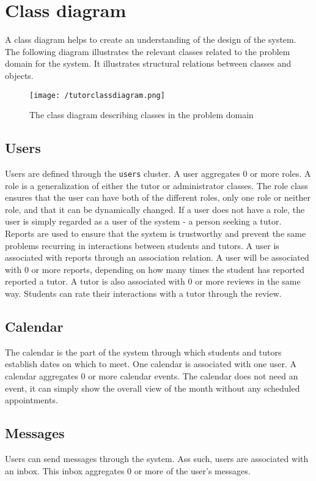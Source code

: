 \section{Class diagram}
A class diagram helps to create an understanding of the design of the system.
The following diagram illustrates the relevant classes related to the problem domain for the system.
It illustrates structural relations between classes and objects\cite{OOAD}.

\begin{figure}[H]
    \texttt{[image: /tutorclassdiagram.png]}
     \caption{The class diagram describing classes in the problem domain}
     \label{fig:class-diagram}
 \end{figure}

\subsection{Users}
Users are defined through the \texttt{users} cluster.
A user aggregates 0 or more roles. 
A role is a generalization of either the tutor or administrator classes. 
The role class ensures that the user can have both of the different roles, only one role or neither role, and that it can be dynamically changed.
If a user does not have a role, the user is simply regarded as a user of the system - a person seeking a tutor. 
Reports are used to ensure that the system is trustworthy and prevent the same problems recurring in interactions between students and tutors.
A user is associated with reports through an association relation.
A user will be associated with 0 or more reports, depending on how many times the student has reported reported a tutor.
A tutor is also associated with 0 or more reviews in the same way. 
Students can rate their interactions with a tutor through the review.

\subsection{Calendar}
The calendar is the part of the system through which students and tutors establish dates on which to meet. 
One calendar is associated with one user.
A calendar aggregates 0 or more calendar events. 
The calendar does not need an event, it can simply show the overall view of the month without any scheduled appointments.

\subsection{Messages}
Users can send messages through the system. 
Ass such, users are associated with an inbox.
This inbox aggregates 0 or more of the user's messages.

